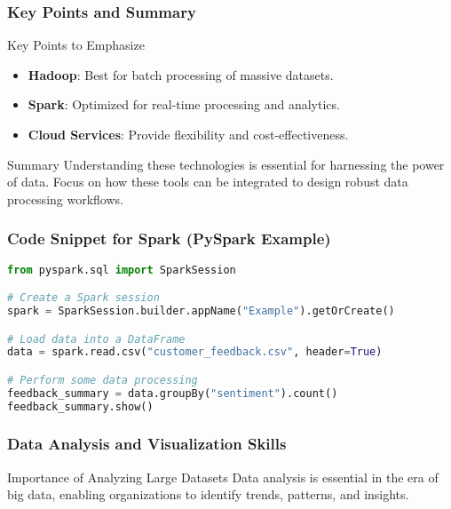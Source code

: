 \documentclass{beamer}
\begin{document}
\begin{frame}[fragile]
    \frametitle{Key Points and Summary}
    \begin{block}{Key Points to Emphasize}
        \begin{itemize}
            \item \textbf{Hadoop}: Best for batch processing of massive datasets.
            \item \textbf{Spark}: Optimized for real-time processing and analytics.
            \item \textbf{Cloud Services}: Provide flexibility and cost-effectiveness.
        \end{itemize}
    \end{block}
    
    \begin{block}{Summary}
        Understanding these technologies is essential for harnessing the power of data. Focus on how these tools can be integrated to design robust data processing workflows.
    \end{block}
\end{frame}

\begin{frame}[fragile]
    \frametitle{Code Snippet for Spark (PySpark Example)}
    \begin{lstlisting}[language=Python]
from pyspark.sql import SparkSession

# Create a Spark session
spark = SparkSession.builder.appName("Example").getOrCreate()

# Load data into a DataFrame
data = spark.read.csv("customer_feedback.csv", header=True)

# Perform some data processing
feedback_summary = data.groupBy("sentiment").count()
feedback_summary.show()
    \end{lstlisting}
\end{frame}

\begin{frame}
    \frametitle{Data Analysis and Visualization Skills}
    \begin{block}{Importance of Analyzing Large Datasets}
        Data analysis is essential in the era of big data, enabling organizations to identify trends, patterns, and insights.
    \end{block}
\end{frame}
\end{document}
